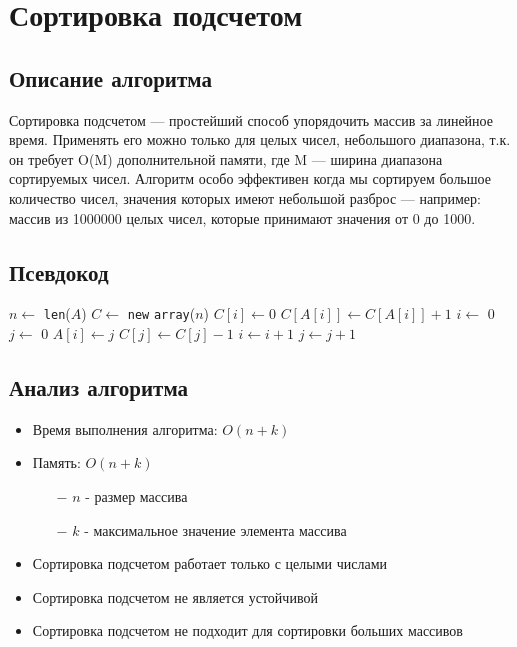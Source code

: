 \section{Сортировка подсчетом}

\subsection{Описание алгоритма}

Сортировка подсчетом — простейший способ упорядочить массив за линейное время.
Применять его можно только для целых чисел, небольшого диапазона,
т.к. он требует O(M) дополнительной памяти,
где M — ширина диапазона сортируемых чисел.
Алгоритм особо эффективен когда мы сортируем большое количество чисел,
значения которых имеют небольшой разброс — например: массив из 1000000 целых чисел,
которые принимают значения от 0 до 1000.\cite{countingsort-ref}

\subsection{Псевдокод}

\begin{algorithmic}
\State $n \gets$ \texttt{len}($A$)
\State $C \gets$ \texttt{new} \texttt{array}($n$)
\State $C[i] \gets 0$
\EndFor
{}
\State $C[A[i]] \gets C[A[i]] + 1$
\EndFor
\State $i \gets$ 0
\State $j \gets$ 0
\State $A[i] \gets j$
\State $C[j] \gets C[j] - 1$
\State $i \gets i + 1$
\Else
\State $j \gets j + 1$
\EndIf
\EndWhile
\EndProcedure
\end{algorithmic}

\subsection{Анализ алгоритма}

\begin{itemize}
    \item Время выполнения алгоритма: $O(n + k)$
    \item Память: $O(n + k)$
    \begin{itemize}
        \item[$-$] $n$ - размер массива
        \item[$-$] $k$ - максимальное значение элемента массива
    \end{itemize}
    \item Сортировка подсчетом работает только с целыми числами
    \item Сортировка подсчетом не является устойчивой
    \item Сортировка подсчетом не подходит для сортировки больших массивов
\end{itemize}

